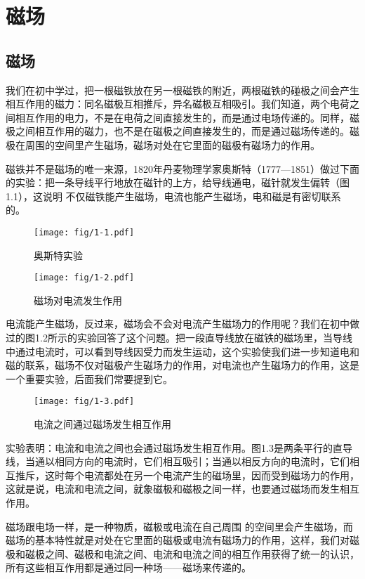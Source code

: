 \chapter{磁场}
\section{磁场}
我们在初中学过，把一根磁铁放在另一根磁铁的附近，两根磁铁的碰极之间会产生相互作用的磁力：同名磁极互相推斥，异名磁极互相吸引。我们知道，两个电荷之间相互作用的电力，不是在电荷之间直接发生的，而是通过电场传递的。同样，磁极之间相互作用的磁力，也不是在磁极之间直接发生的，而是通过磁场传递的。磁极在周围的空间里产生磁场，磁场对处在它里面的磁极有磁场力的作用。

磁铁并不是磁场的唯一来源，1820年丹麦物理学家奥斯特（1777—1851）做过下面的实验：把一条导线平行地放在磁针的上方，给导线通电，磁针就发生偏转（图1.1），这说明
不仅磁铁能产生磁场，电流也能产生磁场，电和磁是有密切联系的。
\begin{figure}[htp]
\centering
\begin{minipage}[t]{0.48\textwidth}
\centering
\texttt{[image: fig/1-1.pdf]}
\caption{奥斯特实验}
\end{minipage}
\begin{minipage}[t]{0.48\textwidth}
\centering
\texttt{[image: fig/1-2.pdf]}
\caption{磁场对电流发生作用}
\end{minipage}
\end{figure}

电流能产生磁场，反过来，磁场会不会对电流产生磁场力的作用呢？我们在初中做过的图1.2所示的实验回答了这个问题。把一段直导线放在磁铁的磁场里，当导线中通过电流时，可以看到导线因受力而发生运动，这个实验使我们进一步知道电和磁的联系，磁场不仅对磁极产生磁场力的作用，对电流也产生磁场力的作用，这是一个重要实验，后面我们常要提到它。

\begin{figure}[htp]\centering
\texttt{[image: fig/1-3.pdf]}
\caption{电流之间通过磁场发生相互作用}
\end{figure}

实验表明：电流和电流之间也会通过磁场发生相互作用。图1.3是两条平行的直导线，当通以相同方向的电流时，它们相互吸引；当通以相反方向的电流时，它们相互推斥，这时每个电流都处在另一个电流产生的磁场里，因而受到磁场力的作用，这就是说，电流和电流之间，就象磁极和磁极之间一样，也要通过磁场而发生相互作用。

磁场跟电场一样，是一种物质，磁极或电流在自己周围
的空间里会产生磁场，而磁场的基本特性就是对处在它里面的磁极或电流有磁场力的作用，这样，我们对磁极和磁极之间、磁极和电流之间、电流和电流之间的相互作用获得了统一的认识，所有这些相互作用都是通过同一种场——磁场来传递的。

